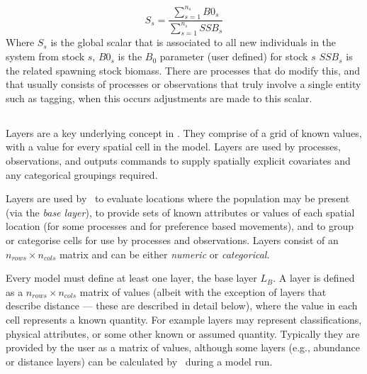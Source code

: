\begin{equation}
	S_s = \frac{\sum_{s = 1}^{n_s}B0_s}{\sum_{s = 1}^{n_s}SSB_s}
\end{equation}
Where $S_s$ is the global scalar that is associated to all new individuals in the system from stock $s$, $B0_s$ is the $B_0$ parameter (user defined) for stock $s$ $SSB_s$ is the related spawning stock biomass. There are processes that do modify this, and that usually consists of processes or observations that truly involve a single entity such as tagging, when this occurs adjustments are made to this scalar.

\subsection{\label{sec:layers}}
Layers are a key underlying concept in \IBM. They comprise of a grid of known values, with a value for every spatial cell in the model. Layers are used by processes, observations, and outputs commands to supply spatially explicit covariates and any categorical groupings required. 

Layers are used by \IBM\ to evaluate locations where the population may be present (via the \emph{base layer}), to provide sets of known attributes or values of each spatial location (for some processes and for preference based movements), and to group or categorise cells for use by processes and observations. Layers consist of an $n_{rows} \times n_{cols}$ matrix and can be either \emph{numeric} or \emph{categorical}. 

Every model must define at least one layer, the base layer $L_B$. A layer is defined as a $n_{rows} \times n_{cols}$ matrix of values (albeit with the exception of layers that describe distance --- these are described in detail below), where the value in each cell represents a known quantity. For example layers may represent classifications, physical attributes, or some other known or assumed quantity. Typically they are provided by the user as a matrix of values, although some layers (e.g., abundance or distance layers) can be calculated by \IBM\ during a model run. 

